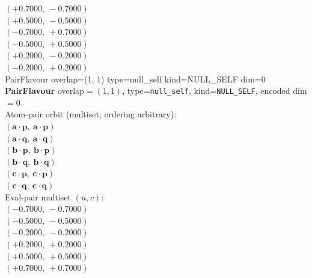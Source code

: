 \documentclass[a4paper,11pt]{article}
\newcommand{\pdcegfomjfhook}[2]{\mathbf{#1} \cdot \mathbf{#2}}
\begin{document}
$(+0.7000,\ -0.7000)$\\
$(+0.5000,\ -0.5000)$\\
$(-0.7000,\ +0.7000)$\\
$(-0.5000,\ +0.5000)$\\
$(+0.2000,\ -0.2000)$\\
$(-0.2000,\ +0.2000)$\\
    PairFlavour  overlap=(1, 1)  type=null\_self  kind=NULL\_SELF  dim=0
\textbf{PairFlavour} overlap$=(1, 1)$, type=\texttt{null\_self}, kind=\texttt{NULL\_SELF}, encoded dim$=0$\\
\quad Atom-pair orbit (multiset; ordering arbitrary):\\
$(\pdcegfomjfhook{a}{p},\ \pdcegfomjfhook{a}{p})$\\
$(\pdcegfomjfhook{a}{q},\ \pdcegfomjfhook{a}{q})$\\
$(\pdcegfomjfhook{b}{p},\ \pdcegfomjfhook{b}{p})$\\
$(\pdcegfomjfhook{b}{q},\ \pdcegfomjfhook{b}{q})$\\
$(\pdcegfomjfhook{c}{p},\ \pdcegfomjfhook{c}{p})$\\
$(\pdcegfomjfhook{c}{q},\ \pdcegfomjfhook{c}{q})$\\
\quad Eval-pair multiset $(u, v)$:\\
$(-0.7000,\ -0.7000)$\\
$(-0.5000,\ -0.5000)$\\
$(-0.2000,\ -0.2000)$\\
$(+0.2000,\ +0.2000)$\\
$(+0.5000,\ +0.5000)$\\
$(+0.7000,\ +0.7000)$\\
\end{document}
